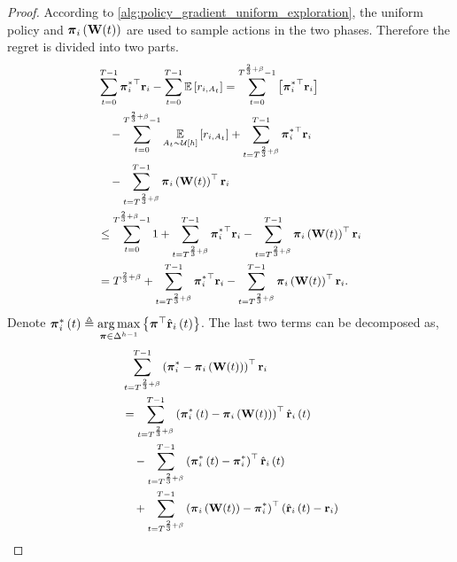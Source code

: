 \begin{proof}
According to \cref{alg:policy_gradient_uniform_exploration}, the uniform policy and ${\boldsymbol{\pi}}_i\left( {\mathbf{W}}(t) \right)$ are used to sample actions in the two phases. Therefore the regret is divided into two parts.
\begin{equation}
\small
\label{eq:total_regret_decomposition}
\begin{split}
    &\sum\limits_{t=0}^{T-1}{ {\rvpi_i^*}^\top \rvr_i } - \sum\limits_{t=0}^{T-1}{ \sE \left[ r_{i, A_t} \right] } = \sum\limits_{t=0}^{T^{\frac{2}{3} + \beta} - 1}{ \left[ {\rvpi_i^*}^\top \rvr_i  \right]} \\
    &\quad - \sum\limits_{t=0}^{T^{\frac{2}{3} + \beta} - 1}{ \expectation\limits_{A_t \sim \gU\left[h\right]}{ \left[ r_{i, A_t} \right] }} + \sum\limits_{t=T^{\frac{2}{3} + \beta}}^{T-1}{ {\rvpi_i^*}^\top \rvr_i } \\
    &\quad - \sum\limits_{t=T^{\frac{2}{3} + \beta}}^{T-1}{ \rvpi_i\left( \rmW(t) \right)^\top \rvr_i } \\
    &\le \sum\limits_{t=0}^{T^{\frac{2}{3} + \beta} - 1}{1} + \sum\limits_{t=T^{\frac{2}{3} + \beta}}^{T-1}{ {\rvpi_i^*}^\top \rvr_i } - \sum\limits_{t=T^{\frac{2}{3} + \beta}}^{T-1}{ \rvpi_i\left( \rmW(t) \right)^\top \rvr_i } \\
    &= T^{\frac{2}{3} + \beta} + \sum\limits_{t=T^{\frac{2}{3} + \beta}}^{T-1}{ {\rvpi_i^*}^\top \rvr_i } - \sum\limits_{t=T^{\frac{2}{3} + \beta}}^{T-1}{ \rvpi_i\left( \rmW(t) \right)^\top \rvr_i }.
\end{split}
\end{equation}
Denote ${\boldsymbol{\pi}}_i^*\left(t\right) \triangleq \operatorname*{arg\,max}\limits_{{\boldsymbol{\pi}} \in \Delta^{h-1}}{\left\{ {\boldsymbol{\pi}}^\top \hat{{\mathbf{r}}}_i\left(t\right)\right\}}$. The last two terms can be decomposed as,
\begin{equation}
\small
\label{eq:playing_learning_phase_regret_decomposition}
\begin{split}
    &\sum\limits_{t=T^{\frac{2}{3} + \beta}}^{T-1}{ \left( {\rvpi_i^*} - \rvpi_i\left( \rmW(t) \right) \right)^\top \rvr_i } \\
    &= \sum\limits_{t=T^{\frac{2}{3} + \beta}}^{T-1}{ \left( {\rvpi_i^*\left(t\right)} - \rvpi_i\left( \rmW(t) \right) \right)^\top \hat{\rvr}_i\left(t\right) } \\
    &\quad - \sum\limits_{t=T^{\frac{2}{3} + \beta}}^{T-1}{ \left( {\rvpi_i^*\left(t\right)} - {\rvpi_i^*} \right)^\top \hat{\rvr}_i\left(t\right) } \\
    &\quad + \sum\limits_{t=T^{\frac{2}{3} + \beta}}^{T-1}{  \left( \rvpi_i\left( \rmW(t) \right) - {\rvpi_i^*}\right)^\top \left(  \hat{\rvr}_i\left(t\right) - \rvr_i \right) } \\

\end{split}
\end{equation}
\end{proof}

